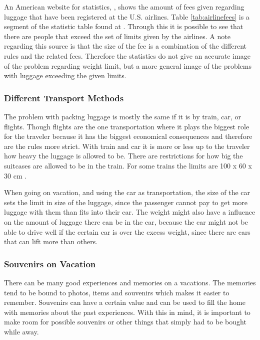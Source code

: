 An American website for statistics, \citep{airstat}, shows the amount of fees given regarding luggage that have been registered at the U.S. airlines. Table \ref{tab:airlinefees} is a segment of the statistic table found at \citep{airstat}. Through this it is possible to see that there are people that exceed the set of limits given by the airlines. A note regarding this source is that the size of the fee is a combination of the different rules and the related fees. Therefore the statistics do not give an accurate image of the problem regarding weight limit, but a more general image of the problems with luggage exceeding the given limits.

\subsubsection{Different Transport Methods}
The problem with packing luggage is mostly the same if it is by train, car, or flights. Though flights are the one transportation where it plays the biggest role for the traveler because it has the biggest economical consequences and therefore are the rules more strict. With train and car it is more or less up to the traveler how heavy the luggage is allowed to be. There are restrictions for how big the suitcases are allowed to be in the train. For some trains the limits are 100 x 60 x 30 cm \citep{rulestrain}.

When going on vacation, and using the car as transportation, the size of the car sets the limit in size of the luggage, since the passenger cannot pay to get more luggage with them than fits into their car. The weight might also have a influence on the amount of luggage there can be in the car, because the car might not be able to drive well if the certain car is over the excess weight, since there are cars that can lift more than others. %

\subsubsection{Souvenirs on Vacation}
There can be many good experiences and memories on a vacations. The memories tend to be bound to photos, items and souvenirs which makes it easier to remember. Souvenirs can have a certain value and can be used to fill the home with memories about the past experiences.
With this in mind, it is important to make room for possible souvenirs or other things that simply had to be bought while away.


